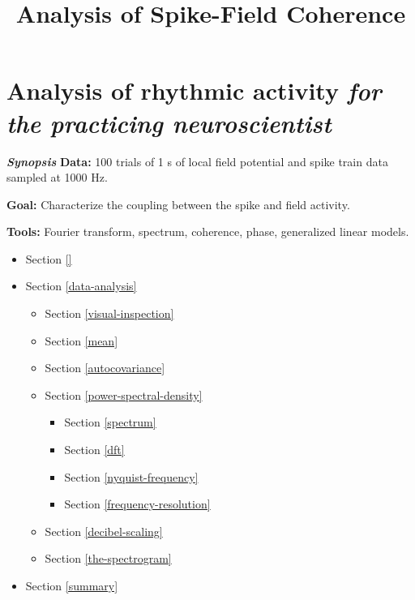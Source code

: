 \documentclass[11pt]{article}
\title{Analysis of Spike-Field Coherence}
\providecommand{\tightlist}{%
      \setlength{\itemsep}{0pt}\setlength{\parskip}{0pt}}
\begin{document}
    
    
    \maketitle
    
    

    
    \section{\texorpdfstring{Analysis of rhythmic activity \emph{for the
practicing neuroscientist}
}{Analysis of rhythmic activity for the practicing neuroscientist }}\label{analysis-of-rhythmic-activity-for-the-practicing-neuroscientist}

    \emph{\textbf{Synopsis}} \textbf{Data:} 100 trials of 1 s of local field
potential and spike train data sampled at 1000 Hz.

\textbf{Goal:} Characterize the coupling between the spike and field
activity.

\textbf{Tools:} Fourier transform, spectrum, coherence, phase,
generalized linear models.

    \begin{itemize}
\tightlist
\item
  Section \ref{}
\item
  Section \ref{data-analysis}

  \begin{itemize}
  \tightlist
  \item
    Section \ref{visual-inspection}
  \item
    Section \ref{mean}
  \item
    Section \ref{autocovariance}
  \item
    Section \ref{power-spectral-density}

    \begin{itemize}
    \tightlist
    \item
      Section \ref{spectrum}
    \item
      Section \ref{dft}
    \item
      Section \ref{nyquist-frequency}
    \item
      Section \ref{frequency-resolution}
    \end{itemize}
  \item
    Section \ref{decibel-scaling}
  \item
    Section \ref{the-spectrogram}
  \end{itemize}
\item
  Section \ref{summary}
\end{itemize}
\end{document}
